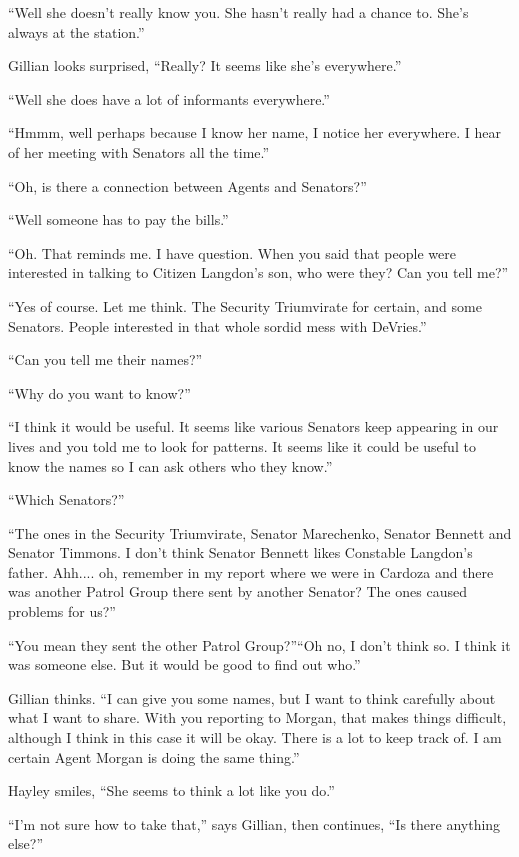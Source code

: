 ``Well she doesn't really know you.  She hasn't really had a chance to.  She's always at the station.''

Gillian looks surprised, ``Really?  It seems like she's everywhere.''

``Well she does have a lot of informants everywhere.''

``Hmmm, well perhaps because I know her name, I notice her everywhere.  I hear of her meeting with Senators all the time.''

``Oh, is there a connection between Agents and Senators?''

``Well someone has to pay the bills.''

``Oh.  That reminds me.  I have question.  When you said that people were interested in talking to Citizen Langdon's son, who were they?  Can you tell me?''

``Yes of course.  Let me think.  The Security Triumvirate for certain, and some Senators.  People interested in that whole sordid mess with DeVries.''

``Can you tell me their names?''

``Why do you want to know?''

``I think it would be useful.  It seems like various Senators keep appearing in our lives and you told me to look for patterns.  It seems like it could be useful to know the names so I can ask others who they know.''

``Which Senators?''

``The ones in the Security Triumvirate, Senator Marechenko, Senator Bennett and Senator Timmons.  I don't think Senator Bennett likes Constable Langdon's father.  Ahh.... oh, remember in my report where we were in Cardoza and there was another Patrol Group there sent by another Senator?  The ones caused problems for us?''

``You mean they sent the other Patrol Group?''``Oh no, I don't think so.  I think it was someone else.  But it would be good to find out who.''

Gillian thinks.  ``I can give you some names, but I want to think carefully about what I want to share.  With you reporting to Morgan, that makes things difficult, although I think in this case it will be okay.  There is a lot to keep track of.  I am certain Agent Morgan is doing the same thing.''

Hayley smiles, ``She seems to think a lot like you do.''

``I'm not sure how to take that,'' says Gillian, then continues, ``Is there anything else?''

